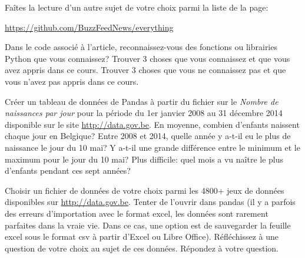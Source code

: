 \begin{exercice}[BuzzFeedNews]
Faîtes la lecture d'un autre sujet de votre choix parmi la liste de la page:
\begin{center}
\url{https://github.com/BuzzFeedNews/everything}
\end{center}
Dans le code associé à l'article, reconnaissez-vous des fonctions ou librairies
Python que vous connaissez? Trouver 3 choses que vous connaissez et que vous
avez appris dans ce cours. Trouver 3 choses que vous ne connaissez pas et que
vous n'avez pas appris dans ce cours.
\end{exercice}

\begin{exercice}
Créer un tableau de données de Pandas à partir du fichier sur le
\emph{Nombre de naissances par jour} pour la période du 1er janvier 2008 au 31
décembre 2014 disponible sur le site \url{http://data.gov.be}.
En moyenne, combien d'enfants naissent chaque jour en Belgique?
Entre 2008 et 2014, quelle année y a-t-il eu le plus de naissance le jour du 10
mai? Y a-t-il une grande différence entre le minimum et le maximum pour le jour
du 10 mai? Plus difficile: quel mois a vu naître le plus d'enfants pendant ces
sept années?
\end{exercice}

\begin{exercice}
Choisir un fichier de données de votre choix parmi les 4800+ jeux de données
disponibles sur \url{http://data.gov.be}. Tenter de l'ouvrir dans pandas (il y a
parfois des erreurs d'importation avec le format excel, les données sont
rarement parfaites dans la vraie vie. Dans ce cas, une option est de sauvegarder
la feuille excel sous le format csv à partir d'Excel ou Libre Office).
Réfléchissez à une question de votre choix au sujet de ces données. Répondez à
votre question.
\end{exercice}


